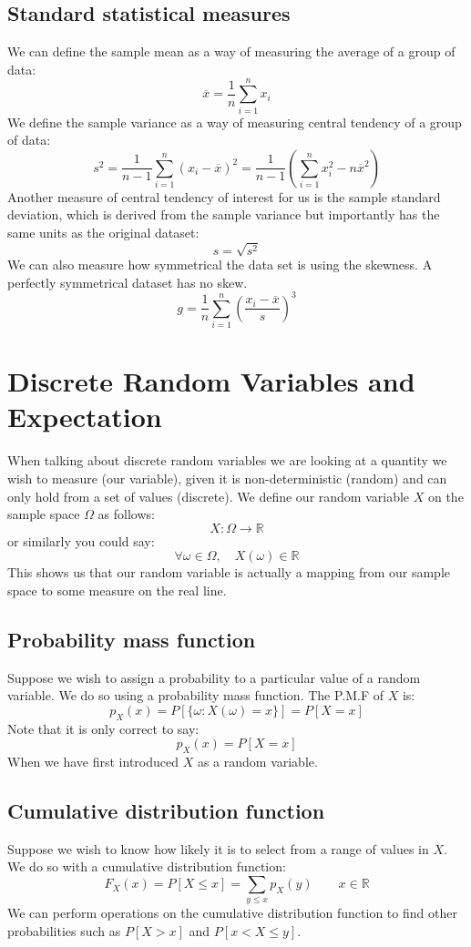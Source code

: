 \documentclass[12pt]{article}
\begin{document}
\subsection*{Standard statistical measures}
We can define the sample mean as a way of measuring the average of a group of data:
\[\overline{x}=\frac{1}{n}\sum_{i=1}^nx_i\]
We define the sample variance as a way of measuring central tendency of a group of data:
\[s^2=\frac{1}{n-1}\sum_{i=1}^n(x_i-\overline{x})^2=\frac{1}{n-1}\left(\sum_{i=1}^nx_i^2-n\overline{x}^2\right)\]
Another measure of central tendency of interest for us is the sample standard deviation, which is derived from the sample variance but importantly has the same units as the original dataset:
\[s=\sqrt{s^2}\]
We can also measure how symmetrical the data set is using the skewness. A perfectly symmetrical dataset has no skew.
\[g=\frac{1}{n}\sum_{i=1}^n\left(\frac{x_i-\overline{x}}{s}\right)^3\]
\section{Discrete Random Variables and Expectation}
When talking about discrete random variables we are looking at a quantity we wish to measure (our variable), given it is non-deterministic (random) and can only hold from a set of values (discrete). We define our random variable \(X\) on the sample space \(\Omega\) as follows:
\[X:\Omega\to\mathbb{R}\]
or similarly you could say:
\[\forall\omega\in\Omega,\quad X(\omega)\in\mathbb{R}\]
This shows us that our random variable is actually a mapping from our sample space to some measure on the real line.
\subsection*{Probability mass function}
Suppose we wish to assign a probability to a particular value of a random variable. We do so using a probability mass function. The P.M.F of \(X\) is:
\[p_X(x)=P[\{\omega:X(\omega)=x\}]=P[X=x]\]
Note that it is only correct to say:
\[p_X(x)=P[X=x]\]
When we have first introduced \(X\) as a random variable.
\subsection*{Cumulative distribution function}
Suppose we wish to know how likely it is to select from a range of values in \(X\). We do so with a cumulative distribution function:
\[F_X(x)=P[X\leq x]=\sum_{y\leq x}p_X(y)\qquad x\in\mathbb{R}\]
We can perform operations on the cumulative distribution function to find other probabilities such as \(P[X>x]\) and \(P[x<X\leq y]\).
\end{document}
